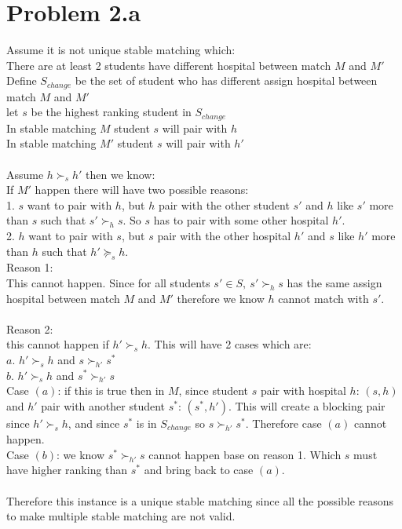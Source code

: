 \documentclass{article}
\begin{document}
\section{Problem 2.a}
Assume it is not unique stable matching which:\\
There are at least 2 students have different hospital between match $M$ and $M'$\\
Define $S_{change}$ be the set of student who has different assign hospital between match $M$ and $M'$\\
let $s$ be the highest ranking student in $S_{change}$\\
In stable matching $M$ student $s$ will pair with $h$\\
In stable matching $M'$ student $s$ will pair with $h'$\\\\
Assume $h \succ_s h'$ then we know:\\
If $M'$ happen there will have two possible reasons:\\
1. $s$ want to pair with $h$, but $h$ pair with the other student $s'$ and $h$ like $s'$ more than $s$ such that $s' \succ_h s$. So $s$ has to pair with some other hospital $h'$.\\
2. $h$ want to pair with $s$, but $s$ pair with the other hospital $h'$ and $s$ like $h'$ more than $h$ such that $h' \succeq_s h$.\\
Reason 1:\\
This cannot happen. Since for all students $s' \in S,\ s' \succ_h s$ has the same assign hospital between match $M$ and $M'$ therefore we know $h$ cannot match with $s'$.\\\\
Reason 2:\\
this cannot happen if $h' \succ_s h$. This will have 2 cases which are:\\
$a.$ $h' \succ_s h$ and $s \succ_{h'} s^*$\\
$b.$ $h' \succ_s h$ and $s^* \succ_{h'} s$\\
Case $(a)$: if this is true then in $M$, since student $s$ pair with hospital $h$: $(s,h)$ and $h'$ pair with another student $s^*$: $(s^*,h')$. This will create a blocking pair since $h' \succ_s h$, and since $s^*$ is in $S_{change}$ so $s \succ_{h'} s^*$. Therefore case $(a)$ cannot happen.\\
Case $(b)$: we know $s^* \succ_{h'} s$ cannot happen base on reason 1. Which $s$ must have higher ranking than $s^*$ and bring back to case $(a)$.\\\\
Therefore this instance is a unique stable matching since all the possible reasons to make multiple stable matching are not valid.
\end{document}
